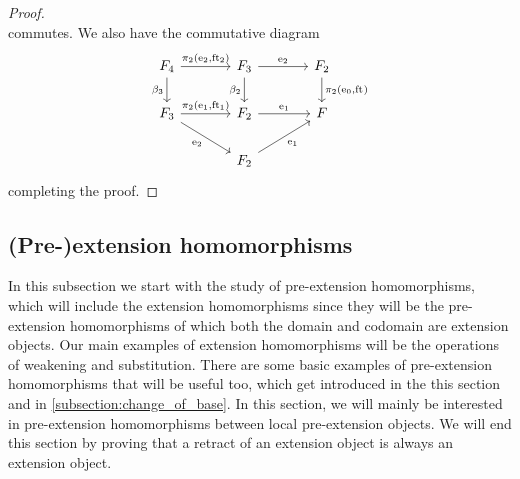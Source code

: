 \begin{proof}
\begin{equation*}
\end{equation*}
commutes. We also have the commutative diagram
\begin{equation*}
\begin{tikzcd}[column sep=large]
\stesysf_4
  \ar{r}{\pullbackpr{2}{\eext{2}}{\eft[2]}}
  \ar{d}[swap]{\beta_3}
  &
\stesysf_3
  \ar{r}{\eext{2}}
  \ar{d}[swap]{\beta_2}
  &
\stesysf_2
  \ar{d}{\pullbackpr{2}{\ectxext}{\eft}}
  \\
\stesysf_3
  \ar{r}{\pullbackpr{2}{\efamext}{\eft[1]}}
  \ar{dr}[swap]{\eext{2}}
  &
\stesysf_2
  \ar{r}{\efamext}
  &
\stesysf
  \\
  {} &
\stesysf_2
  \ar{ur}[swap]{\efamext}
\end{tikzcd}
\end{equation*}
completing the proof.
\end{proof}

\subsection{(Pre-)extension homomorphisms}\label{subsection:e_extension_homomorphisms}
In this subsection we start with the study of pre-extension homomorphisms, which
will include the extension homomorphisms since they will be the pre-extension
homomorphisms of which both the domain and codomain are extension objects.
Our main examples of extension homomorphisms will be the operations of weakening
and substitution. There are some basic examples of pre-extension homomorphisms
that will be useful too, which get introduced in the this section and in
\autoref{subsection:change_of_base}. In this section, we will mainly be
interested in pre-extension homomorphisms between local pre-extension objects.
We will end this section by proving that a retract of an extension object is
always an extension object.

